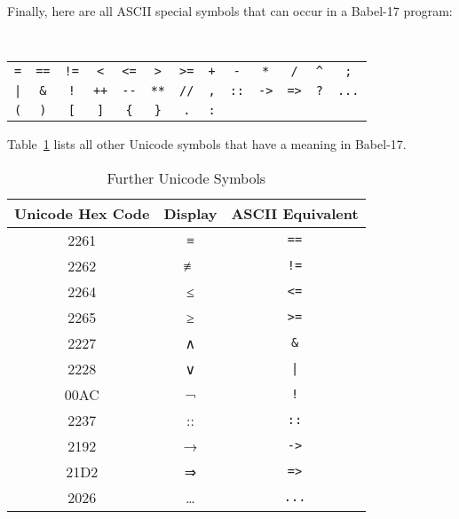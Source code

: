 \documentclass[11pt]{amsart}
\newcommand{\babelsrc}[1] {\lstinline!#1!}
\begin{document}
Finally, here are all ASCII special symbols that can occur in a Babel-17 program:
\newcommand{\mapcurlyleft}{\{|}
\begin{center}
\tt
\begin{tabular}{ccccccccccccc}
\verb+=+ & \verb+==+ & \verb+!=+ & \verb+<+ & \verb+<=+ & \verb+>+& \verb+>=+  &
\verb-+- & \verb+-+ & \verb+*+ & \verb+/+ & \verb+^+ & \verb+;+  \\
\verb-|- & \verb+&+ & \verb+!+ & \verb-++- & \verb+--+& \verb+**+  &
\verb-//- & \verb+,+ & \verb+::+ & \verb+->+ & \verb+=>+& \verb+?+  & \verb+...+  \\
\verb-(- & \verb+)+ & \verb+[+ & \verb+]+ & \verb+{+& \verb+}+  & \verb+.+ &  \verb+:+ &
& & & 
\end{tabular}
\end{center}
Table~\ref{table:furthersymbols} lists all other Unicode symbols that have a meaning in Babel-17.
\begin{table}
\caption{Further Unicode Symbols}
\begin{tabular}{c|c|c}
\textbf{Unicode Hex Code} & \textbf{Display} & \textbf{ASCII Equivalent}\\\hline
2261 & ≡ & \verb+==+\\
2262 & ≢ & \verb+!=+\\
2264 & ≤ & \verb+<=+\\
2265 &  ≥ & \verb+>=+\\
2227 & ∧ & \verb+&+\\
2228 & ∨ & \verb+|+\\
00AC & ¬ & \verb+!+\\
2237 & :: & \verb+::+\\
2192 & → & \verb+->+\\
21D2 & ⇒ & \verb+=>+\\
2026 & … & \verb+...+\\
\end{tabular}
\label{table:furthersymbols}
\end{table}
\end{document}

